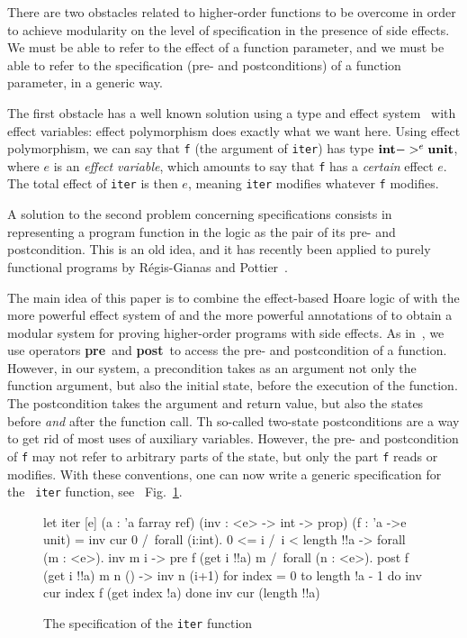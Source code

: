 \documentclass[a4paper]{llncs}
\newcommand{\preml}{{\bf pre}}
\newcommand{\postml}{{\bf post}}
\newcommand{\unitml}{{\bf unit}}
\newcommand{\intml}{{\bf int}}
\begin{document}
There are two obstacles related to higher-order functions to be
overcome in order to achieve modularity on the level of specification
in the presence of side effects. We must be able to refer to the
effect of a function parameter, and we must be able to refer to the
specification (pre- and postconditions) of a function parameter, in a
generic way.

The first obstacle has a well known solution using a type and effect
system~\cite{talpin94taed} with effect variables: effect polymorphism
does exactly what we want here. Using effect polymorphism, we can say
that {\tt f} (the argument of {\tt iter}) has type
$\intml->^e\unitml$, where $e$ is an {\em effect variable}, which
amounts to say that {\tt f} has a {\em certain} effect $e$. The total
effect of {\tt iter} is then $e$, meaning {\tt iter}
modifies whatever {\tt f} modifies.

A solution to the second problem concerning specifications consists in
representing a program function in the logic as the pair of its pre- and
postcondition. This is an old idea, and it has recently been applied to purely
functional programs by Régis-Gianas and
Pottier~\cite{regis-gianas-pottier-08}. 

The main idea of this paper is to combine the effect-based Hoare logic of
\cite{Filliatre00a} with the more powerful effect system of
\cite{talpin94taed} and the more powerful annotations of
\cite{regis-gianas-pottier-08} to obtain a modular system for proving
higher-order programs with side effects. As in~\cite{regis-gianas-pottier-08},
we use operators \preml\ and \postml\ to access the pre- and postcondition of
a function. However, in our system, a precondition takes as an argument not
only the function argument, but also the initial state, before the execution
of the function. The postcondition takes the argument and return value, but
also the states before {\em and} after the function call. Th so-called
two-state postconditions are a way to get rid of most uses of auxiliary
variables. However, the pre- and postcondition of {\tt f} may not refer to
arbitrary parts of the state, but only the part {\tt f} reads or modifies.
With these conventions, one can now write a generic specification for the {\tt
iter} function, see ~Fig.~\ref{fig:iter}.

\begin{figure}[tbp]
\begin{who}[lines]
let iter [e] (a : 'a farray ref) (inv : <e> -> int ->  prop)
  (f : 'a ->{e} unit) =
  { inv cur 0 /\ forall (i:int). 0 <= i /\ i < length !!a ->
    forall (m : <e>).  inv m i -> pre f (get i !!a) m /\
    forall (n : <e>).  post f (get i !!a) m n () -> inv n (i+1)
  }
  for index = 0 to length !a - 1 do
    { inv cur index }
    f (get index !a)
  done
  {inv cur (length !!a) }
\end{who}
\caption{The specification of the {\tt iter} function}
  \label{fig:iter}
\end{figure}
\end{document}

